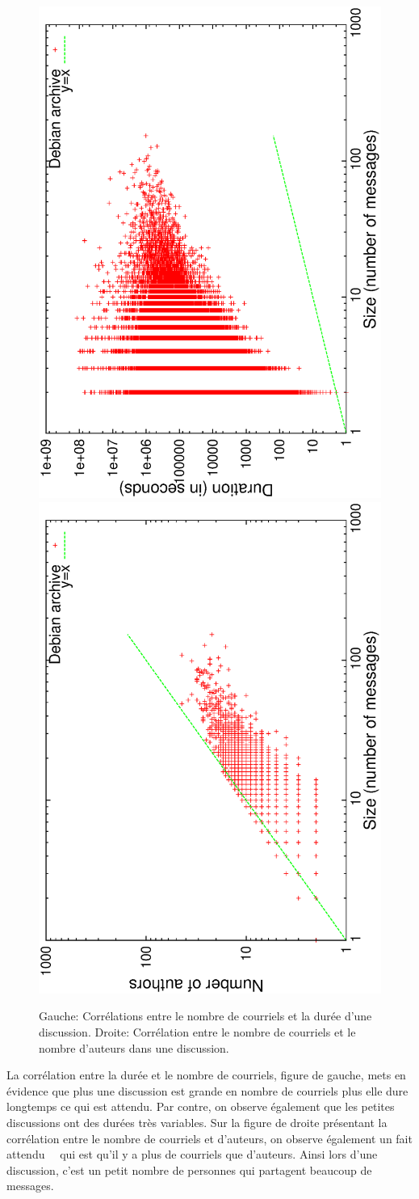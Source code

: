 \begin{figure}
	\includegraphics[angle=-90, width=0.49\linewidth]{img/mailing/sizes-durations-corr.eps}
	\includegraphics[angle=-90, width=0.49\linewidth]{img/mailing/sizes-authors-corr.eps}
	\caption{Gauche: Corrélations entre le nombre de courriels et la durée d'une discussion. Droite: Corrélation entre le nombre de courriels et le nombre d'auteurs dans une discussion.}
	\label{fig:corr_discussion}
\end{figure}

La corrélation entre la durée et le nombre de courriels, figure de gauche, mets en évidence que plus une discussion est grande en nombre de courriels plus elle dure longtemps ce qui est attendu.
Par contre, on observe également que les petites discussions ont des durées très variables. 
Sur la figure de droite présentant la corrélation entre le nombre de courriels et d'auteurs, on observe également un fait attendu~~\cite{Dorat2007} qui est qu'il y a plus de courriels que d'auteurs. Ainsi lors d'une discussion, c'est un petit nombre de personnes qui partagent beaucoup de messages. 

